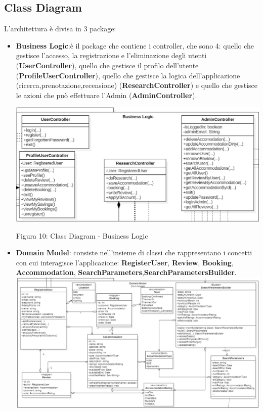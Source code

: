 \documentclass[10pt]{article}
\begin{document}
\subsection{Class Diagram}
L'architettura è divisa in 3 package:
\begin{itemize}
\item \textbf{Business Logic}:è il package che contiene i controller, che sono 4: quello che gestisce l'accesso, la registrazione e l'eliminazione degli utenti (\textbf{UserController}), quello che gestisce il profilo dell'utente (\textbf{ProfileUserController}), quello che gestisce la logica dell'applicazione (ricerca,prenotazione,recensione) (\textbf{ResearchController}) e quello che gestisce le azioni che può effettuare l'Admin (\textbf{AdminController}). 
\par\medskip
\hspace*{-0.75cm}
\includegraphics[scale=0.6]{uml/BusinessLogic}
\begin{center}
Figura 10: Class Diagram - Business Logic 
\end{center}
\item \textbf{Domain Model}: consiste nell’insieme di classi che rappresentano i concetti con cui interagisce l’applicazione: \textbf{RegisterUser}, \textbf{Review}, \textbf{Booking}, \textbf{Accommodation}, \textbf{SearchParameters},\textbf{SearchParametersBuilder}.
\hspace*{-0.5cm}
\includegraphics[scale=0.58]{uml/domainModel}

\end{itemize}
\end{document}
